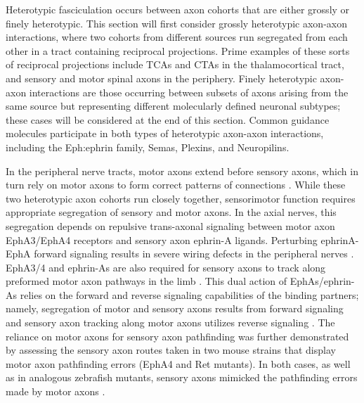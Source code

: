 \label{sec:HeterotypicFascic}
Heterotypic fasciculation occurs between axon cohorts that are either grossly or finely heterotypic.
This section will first consider grossly heterotypic axon-axon interactions, where two cohorts from different sources run segregated from each other in a tract containing reciprocal projections.
Prime examples of these sorts of reciprocal projections include TCAs and CTAs in the thalamocortical tract, and sensory and motor spinal axons in the periphery.
Finely heterotypic axon-axon interactions are those occurring between subsets of axons arising from the same source but representing different molecularly defined neuronal subtypes; these cases will be considered at the end of this section.
Common guidance molecules participate in both types of heterotypic axon-axon interactions, including the Eph:ephrin family, Semas, Plexins, and Neuropilins. 

In the peripheral nerve tracts, motor axons extend before sensory axons, which in turn rely on motor axons to form correct patterns of connections \cite{wang2013axons}.
While these two heterotypic axon cohorts run closely together, sensorimotor function requires appropriate segregation of sensory and motor axons.
In the axial nerves, this segregation depends on repulsive trans-axonal signaling between motor axon EphA3/EphA4 receptors and sensory axon ephrin-A ligands.
Perturbing ephrinA-EphA forward signaling results in severe wiring defects in the peripheral nerves \cite{gallarda2008segregation}.
EphA3/4 and ephrin-As are also required for sensory axons to track along preformed motor axon pathways in the limb \cite{wang2011anatomical}.
This dual action of EphAs/ephrin-As relies on the forward and reverse signaling capabilities of the binding partners; namely, segregation of motor and sensory axons results from forward signaling and sensory axon tracking along motor axons utilizes reverse signaling \cite{wang2011anatomical}.
The reliance on motor axons for sensory axon pathfinding was further demonstrated by assessing the sensory axon routes taken in two mouse strains that display motor axon pathfinding errors (EphA4 and Ret mutants).
In both cases, as well as in analogous zebrafish mutants, sensory axons mimicked the pathfinding errors made by motor axons \cite{wang2014conserved}.

